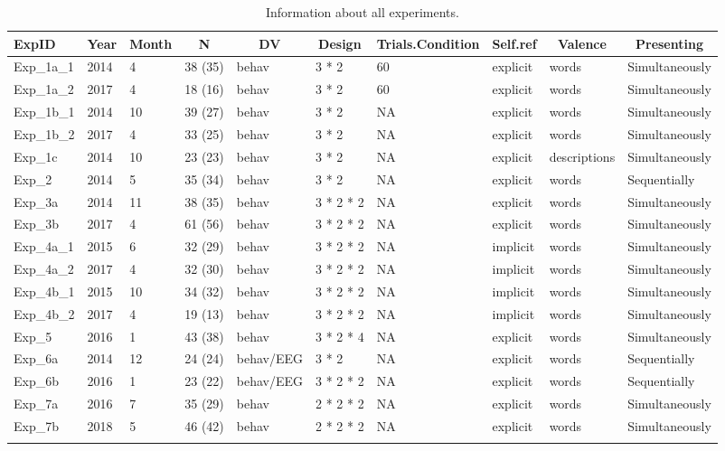\documentclass[
  man]{apa6}
\begin{document}
\begin{table}[tbp]

\begin{center}
\begin{threeparttable}

\caption{\label{tab:Table_1_exp_info}Information about all experiments.}

\begin{tabular}{llllllllll}
\toprule
ExpID & \multicolumn{1}{c}{Year} & \multicolumn{1}{c}{Month} & \multicolumn{1}{c}{N} & \multicolumn{1}{c}{DV} & \multicolumn{1}{c}{Design} & \multicolumn{1}{c}{Trials.Condition} & \multicolumn{1}{c}{Self.ref} & \multicolumn{1}{c}{Valence} & \multicolumn{1}{c}{Presenting}\\
\midrule
Exp\_1a\_1 & 2014 & 4 & 38 (35) & behav & 3 * 2 & 60 & explicit & words & Simultaneously\\
Exp\_1a\_2 & 2017 & 4 & 18 (16) & behav & 3 * 2 & 60 & explicit & words & Simultaneously\\
Exp\_1b\_1 & 2014 & 10 & 39 (27) & behav & 3 * 2 & NA & explicit & words & Simultaneously\\
Exp\_1b\_2 & 2017 & 4 & 33 (25) & behav & 3 * 2 & NA & explicit & words & Simultaneously\\
Exp\_1c & 2014 & 10 & 23 (23) & behav & 3 * 2 & NA & explicit & descriptions & Simultaneously\\
Exp\_2 & 2014 & 5 & 35 (34) & behav & 3 * 2 & NA & explicit & words & Sequentially\\
Exp\_3a & 2014 & 11 & 38 (35) & behav & 3 * 2 * 2 & NA & explicit & words & Simultaneously\\
Exp\_3b & 2017 & 4 & 61 (56) & behav & 3 * 2 * 2 & NA & explicit & words & Simultaneously\\
Exp\_4a\_1 & 2015 & 6 & 32 (29) & behav & 3 * 2 * 2 & NA & implicit & words & Simultaneously\\
Exp\_4a\_2 & 2017 & 4 & 32 (30) & behav & 3 * 2 * 2 & NA & implicit & words & Simultaneously\\
Exp\_4b\_1 & 2015 & 10 & 34 (32) & behav & 3 * 2 * 2 & NA & implicit & words & Simultaneously\\
Exp\_4b\_2 & 2017 & 4 & 19 (13) & behav & 3 * 2 * 2 & NA & implicit & words & Simultaneously\\
Exp\_5 & 2016 & 1 & 43 (38) & behav & 3 * 2 * 4 & NA & explicit & words & Simultaneously\\
Exp\_6a & 2014 & 12 & 24 (24) & behav/EEG & 3 * 2 & NA & explicit & words & Sequentially\\
Exp\_6b & 2016 & 1 & 23 (22) & behav/EEG & 3 * 2 * 2 & NA & explicit & words & Sequentially\\
Exp\_7a & 2016 & 7 & 35 (29) & behav & 2 * 2 * 2 & NA & explicit & words & Simultaneously\\
Exp\_7b & 2018 & 5 & 46 (42) & behav & 2 * 2 * 2 & NA & explicit & words & Simultaneously\\
\bottomrule
\addlinespace
\end{tabular}


\end{threeparttable}
\end{center}
\end{table}
\end{document}
